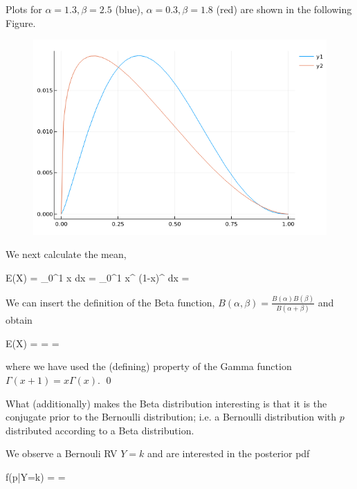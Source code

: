 Plots for $\alpha=1.3, \beta=2.5$ (blue), $\alpha=0.3, \beta=1.8$ (red) are shown in the following Figure.

\begin{figure}[hbt!]
\centering
\includegraphics[scale=0.5]{images/beta_dist_2.png}
\end{figure}



We next calculate the mean,

\bee
E(X) = \int_0^1 x  dx =  \int_0^1 x^{\alpha} (1-x)^{} dx =  
\eee

We can insert the definition of the Beta function, $B(\alpha, \beta) = \frac{B(\alpha) B(\beta)}{B(\alpha+\beta)}$ and obtain

\bee
E(X) =  =  = \frac{\alpha}{\alpha + \beta}
\eee

where we have used the (defining) property of the Gamma function $\Gamma(x+1) = x \Gamma(x)$. \qed


What (additionally) makes the Beta distribution interesting is that it is the conjugate prior to the Bernoulli distribution; i.e. a Bernoulli distribution with $p$ distributed according to a  Beta distribution.

We observe a Bernouli RV $Y=k$ and are interested in the posterior pdf 

\bee
f(p|Y=k) =  = 
\eee


